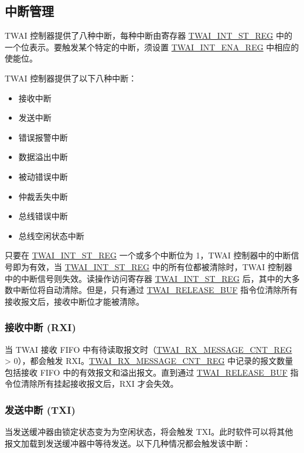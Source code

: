 \documentclass[main\_\_CN.tex]{subfiles}
\begin{document}
\subsection{中断管理}
\label{sec:twai-interrupt-management}
\chipname{} TWAI 控制器提供了八种中断，每种中断由寄存器 \hyperref[regdesc:TWAIINTSTREG]{TWAI\_INT\_ST\_REG} 中的一个位表示。要触发某个特定的中断，须设置 \hyperref[regdesc:TWAIINTENAREG]{TWAI\_INT\_ENA\_REG} 中相应的使能位。

TWAI 控制器提供了以下八种中断：

\begin{itemize}
    \item 接收中断
    \item 发送中断
    \item 错误报警中断
    \item 数据溢出中断
    \item 被动错误中断
    \item 仲裁丢失中断
    \item 总线错误中断
    \item 总线空闲状态中断
\end{itemize}

只要在 \hyperref[regdesc:TWAIINTSTREG]{TWAI\_INT\_ST\_REG} 一个或多个中断位为 1，TWAI 控制器中的中断信号即为有效，当 \hyperref[regdesc:TWAIINTSTREG]{TWAI\_INT\_ST\_REG} 中的所有位都被清除时，TWAI 控制器中的中断信号则失效。读操作访问寄存器 \hyperref[regdesc:TWAIINTSTREG]{TWAI\_INT\_ST\_REG} 后，其中的大多数中断位将自动清除。但是，只有通过 \hyperref[fielddesc:TWAIRELEASEBUF]{TWAI\_RELEASE\_BUF} 指令位清除所有接收报文后，接收中断位才能被清除。

\subsubsection{接收中断 (RXI)}
当 TWAI 接收 FIFO 中有待读取报文时（\hyperref[regdesc:TWAIRXMESSAGECNTREG]{TWAI\_RX\_MESSAGE\_CNT\_REG} > 0），都会触发 RXI。\hyperref[regdesc:TWAIRXMESSAGECNTREG]{TWAI\_RX\_MESSAGE\_CNT\_REG} 中记录的报文数量包括接收 FIFO 中的有效报文和溢出报文。直到通过 \hyperref[fielddesc:TWAIRELEASEBUF]{TWAI\_RELEASE\_BUF} 指令位清除所有挂起接收报文后，RXI 才会失效。

\subsubsection{发送中断 (TXI)}
当发送缓冲器由锁定状态变为为空闲状态，将会触发 TXI。此时软件可以将其他报文加载到发送缓冲器中等待发送。以下几种情况都会触发该中断： 
\end{document}
